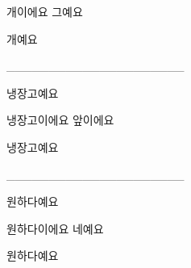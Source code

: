 \documentclass[addpoints, 30pt]{../exam}%
\begin{document}
\begin{questions}
\begin{choices}
\choice%
개이에요%
\CorrectChoice%
그예요%
\end{choices}%
\begin{solution}%
개예요%
\end{solution}%
\question[1]%
\_\_\_\_\_\_\_\_\_\_\_\_\_\_\_\_\_\_\_\_\_%
\begin{choices}%
\begin{solution}%
냉장고예요%
\end{solution}%
\choice%
냉장고이에요%
\CorrectChoice%
앞이에요%
\end{choices}%
\begin{solution}%
냉장고예요%
\end{solution}%
\question[1]%
\_\_\_\_\_\_\_\_\_\_\_\_\_\_\_\_\_\_\_\_\_%
\begin{choices}%
\begin{solution}%
원하다예요%
\end{solution}%
\choice%
원하다이에요%
\CorrectChoice%
네예요%
\end{choices}%
\begin{solution}%
원하다예요%
\end{solution}%
\end{questions}%
\end{document}
